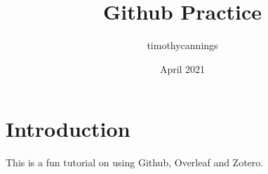 \documentclass{article}
\title{Github Practice}
\author{timothycannings }
\date{April 2021}
\begin{document}
\maketitle

\section{Introduction}
This is a fun tutorial on using Github, Overleaf and Zotero.  
\end{document}
